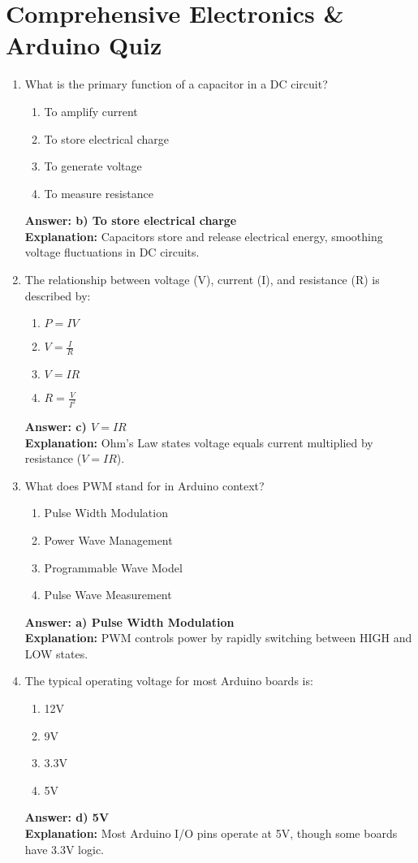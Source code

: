 \documentclass{article}
\begin{document}
	
	\section*{Comprehensive Electronics \& Arduino Quiz}
	
	\begin{enumerate}
		\item What is the primary function of a capacitor in a DC circuit?
		\begin{enumerate}
			\item To amplify current
			\item To store electrical charge
			\item To generate voltage
			\item To measure resistance
		\end{enumerate}
		\textbf{Answer: b) To store electrical charge} \\
		\textbf{Explanation:} Capacitors store and release electrical energy, smoothing voltage fluctuations in DC circuits.
		
		\item The relationship between voltage (V), current (I), and resistance (R) is described by:
		\begin{enumerate}
			\item $P = IV$
			\item $V = \frac{I}{R}$
			\item $V = IR$
			\item $R = \frac{V}{I^2}$
		\end{enumerate}
		\textbf{Answer: c) $V = IR$} \\
		\textbf{Explanation:} Ohm's Law states voltage equals current multiplied by resistance ($V = IR$).
		
		\item What does PWM stand for in Arduino context?
		\begin{enumerate}
			\item Pulse Width Modulation
			\item Power Wave Management
			\item Programmable Wave Model
			\item Pulse Wave Measurement
		\end{enumerate}
		\textbf{Answer: a) Pulse Width Modulation} \\
		\textbf{Explanation:} PWM controls power by rapidly switching between HIGH and LOW states.
		
		\item The typical operating voltage for most Arduino boards is:
		\begin{enumerate}
			\item 12V
			\item 9V
			\item 3.3V
			\item 5V
		\end{enumerate}
		\textbf{Answer: d) 5V} \\
		\textbf{Explanation:} Most Arduino I/O pins operate at 5V, though some boards have 3.3V logic.
		

\end{enumerate}
\end{document}
